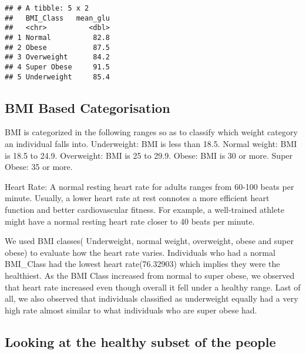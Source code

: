 \documentclass[]{article}
\newenvironment{Shaded}{\begin{snugshade}}{\end{snugshade}}
\newcommand{\KeywordTok}[1]{\textcolor[rgb]{0.13,0.29,0.53}{\textbf{#1}}}
\newcommand{\DataTypeTok}[1]{\textcolor[rgb]{0.13,0.29,0.53}{#1}}
\newcommand{\DecValTok}[1]{\textcolor[rgb]{0.00,0.00,0.81}{#1}}
\newcommand{\FloatTok}[1]{\textcolor[rgb]{0.00,0.00,0.81}{#1}}
\newcommand{\StringTok}[1]{\textcolor[rgb]{0.31,0.60,0.02}{#1}}
\newcommand{\CommentTok}[1]{\textcolor[rgb]{0.56,0.35,0.01}{\textit{#1}}}
\newcommand{\OperatorTok}[1]{\textcolor[rgb]{0.81,0.36,0.00}{\textbf{#1}}}
\newcommand{\NormalTok}[1]{#1}
\begin{document}
\begin{verbatim}
## # A tibble: 5 x 2
##   BMI_Class   mean_glu
##   <chr>          <dbl>
## 1 Normal          82.8
## 2 Obese           87.5
## 3 Overweight      84.2
## 4 Super Obese     91.5
## 5 Underweight     85.4
\end{verbatim}

\subsection{BMI Based Categorisation}\label{bmi-based-categorisation}

BMI is categorized in the following ranges so as to classify which
weight category an individual falls into. Underweight: BMI is less than
18.5. Normal weight: BMI is 18.5 to 24.9. Overweight: BMI is 25 to 29.9.
Obese: BMI is 30 or more. Super Obese: 35 or more.

Heart Rate: A normal resting heart rate for adults ranges from 60-100
beats per minute. Usually, a lower heart rate at rest connotes a more
efficient heart function and better cardiovascular fitness. For example,
a well-trained athlete might have a normal resting heart rate closer to
40 beats per minute.

We used BMI classes( Underweight, normal weight, overweight, obese and
super obese) to evaluate how the heart rate varies. Individuals who had
a normal BMI\_Class had the lowest heart rate(76.32903) which implies
they were the healthiest. As the BMI Class increased from normal to
super obese, we observed that heart rate increased even though overall
it fell under a healthy range. Last of all, we also observed that
individuals classified as underweight equally had a very high rate
almost similar to what individuals who are super obese had.

\subsection{Looking at the healthy subset of the
people}\label{looking-at-the-healthy-subset-of-the-people}

\begin{Shaded}
\end{Shaded}
\end{document}
